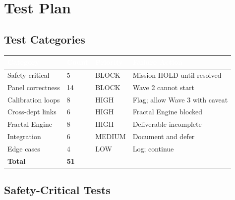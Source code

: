 \documentclass[11pt,letterpaper]{article}
\newcommand{\tableheader}[1]{\textbf{\sffamily\textcolor{white}{#1}}}
\begin{document}
\section{Test Plan}

\subsection{Test Categories}

\begin{center}
\begin{tabularx}{\textwidth}{L{3.5cm}C{1.8cm}C{2cm}X}
\toprule
{}
\tableheader{Category} & \tableheader{Count} & \tableheader{Priority} & \tableheader{Failure Action} \\
\midrule
Safety-critical & 5 & BLOCK & Mission HOLD until resolved \\
Panel correctness & 14 & BLOCK & Wave 2 cannot start \\
Calibration loops & 8 & HIGH & Flag; allow Wave 3 with caveat \\
Cross-dept links & 6 & HIGH & Fractal Engine blocked \\
Fractal Engine & 8 & HIGH & Deliverable incomplete \\
Integration & 6 & MEDIUM & Document and defer \\
Edge cases & 4 & LOW & Log; continue \\
\midrule
\textbf{Total} & \textbf{51} & & \\
\bottomrule
\end{tabularx}
\end{center}

\subsection{Safety-Critical Tests}
\end{document}
